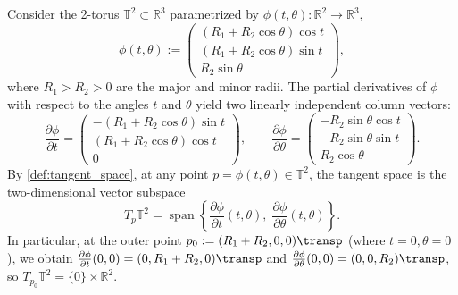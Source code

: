 \begin{example}
\label{ex:torus_tangent_space}
Consider the 2-torus $\mathbb{T}^2 \subset \mathbb{R}^3$ parametrized by $\phi(t,\theta) : \mathbb{R}^2 \to \mathbb{R}^3$,
\[
\phi(t,\theta) := \begin{pmatrix} (R_1 + R_2 \cos\theta)\cos t \\ (R_1 + R_2 \cos\theta)\sin t \\ R_2 \sin\theta \end{pmatrix},
\]
where $R_1 > R_2 > 0$ are the major and minor radii. The partial derivatives of $\phi$ with respect to the angles $t$ and $\theta$ yield two linearly independent column vectors:
\[
\frac{\partial \phi}{\partial t} = \begin{pmatrix} -(R_1 + R_2\cos\theta)\sin t \\ (R_1 + R_2\cos\theta)\cos t \\ 0 \end{pmatrix}, \qquad
\frac{\partial \phi}{\partial \theta} = \begin{pmatrix} -R_2\sin\theta\cos t \\ -R_2\sin\theta\sin t \\ R_2\cos\theta \end{pmatrix}.
\]
By \cref{def:tangent_space}, at any point $p = \phi(t,\theta) \in \mathbb{T}^2$, the tangent space is the two-dimensional vector subspace
\[
T_p \mathbb{T}^2 = \operatorname{span}\left\{ \frac{\partial \phi}{\partial t}(t,\theta), \; \frac{\partial \phi}{\partial \theta}(t,\theta) \right\}.
\]
In particular, at the outer point $p_0 := (R_1+R_2, 0, 0)\transp$ (where $t = 0, \theta = 0$), we obtain $\frac{\partial \phi}{\partial t}(0,0) = (0, R_1+R_2, 0)\transp$ and $\frac{\partial \phi}{\partial \theta}(0,0) = (0, 0, R_2)\transp$, so $T_{p_0}\mathbb{T}^2 = \{0\} \times \mathbb{R}^2$.
\end{example}

\begin{center}
\end{center}

